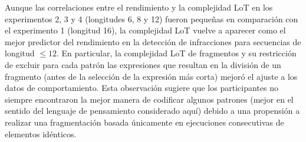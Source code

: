
Aunque las correlaciones entre el rendimiento y la complejidad LoT en los experimentos 2, 3 y 4 (longitudes 6, 8 y 12) fueron pequeñas en comparación con el experimento 1 (longitud 16), la complejidad LoT vuelve a aparecer como el mejor predictor del rendimiento en la detección de infracciones para secuencias de longitud $\leq 12$. En particular, la complejidad LoT de fragmentos y su restricción de excluir para cada patrón las expresiones que resultan en la división de un fragmento (antes de la selección de la expresión más corta) mejoró el ajuste a los datos de comportamiento. Esta observación sugiere que los participantes no siempre encontraron la mejor manera de codificar algunos patrones (mejor en el sentido del lenguaje de pensamiento considerado aquí) debido a una propensión a realizar una fragmentación basada únicamente en ejecuciones consecutivas de elementos idénticos.


